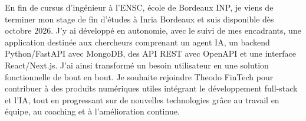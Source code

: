 
\begin{cvparagraph}
En fin de cursus d’ingénieur à l’ENSC, école de Bordeaux INP, je viens de terminer mon stage de fin d’études à Inria Bordeaux et suis disponible dès octobre 2026. J’y ai développé en autonomie, avec le suivi de mes encadrants, une application destinée aux chercheurs comprenant un agent IA, un backend Python/FastAPI avec MongoDB, des API REST avec OpenAPI et une interface React/Next.js. J’ai ainsi transformé un besoin utilisateur en une solution fonctionnelle de bout en bout. Je souhaite rejoindre Theodo FinTech pour contribuer à des produits numériques utiles intégrant le développement full-stack et l’IA, tout en progressant sur de nouvelles technologies grâce au travail en équipe, au coaching et à l’amélioration continue.
\end{cvparagraph}
